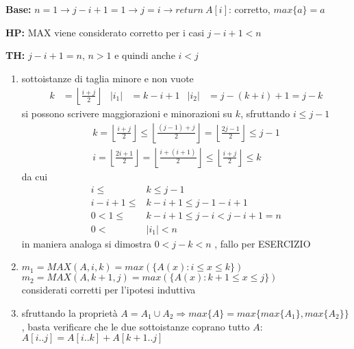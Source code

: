 \begin{description}
    \item{\textbf{Base:}} $n=1 \rightarrow j-i+1=1 \rightarrow j=i \rightarrow return \: A[i]$: corretto, $max\{a\}=a$
    \item{\textbf{HP:}} MAX viene considerato corretto per i casi $j-i+1 < n$
    \item{\textbf{TH:}} $j-i+1 = n$, $n>1$ e quindi anche $i<j$
        \begin{enumerate}[noitemsep,topsep=0pt,parsep=0pt,partopsep=0pt]
            \item sottoistanze di taglia minore e non vuote
                \begin{align*}
                    k&= \left\lfloor \frac{i+j}{2}\right\rfloor & |i_1| &= k-i+1  & |i_2| &= j-(k+i)+1 = j-k
                \end{align*}
                si possono scrivere maggiorazioni e minorazioni su $k$, sfruttando $i \leq j-1$
                \begin{gather*}
                    k= \left\lfloor \frac{i+j}{2}\right\rfloor \leq
                    \left\lfloor \frac{(j-1)+j}{2}\right\rfloor = 
                    \left\lfloor \frac{2j-1}{2}\right\rfloor \leq j-1 \\
                    i= \left\lfloor \frac{2i+1}{2}\right\rfloor
                    = \left\lfloor \frac{i+(i+1)}{2}\right\rfloor 
                    \leq \left\lfloor \frac{i+j}{2}\right\rfloor 
                    \leq k
                \end{gather*}
                da cui 
                \begin{equation*}
                    \begin{split}
                    i \leq &k \leq j-1 \\
                    i-i+1 \leq &k-i+1 \leq j-1-i+1 \\
                    0 < 1 \leq &k-i+1 \leq j-i < j-i+1 = n\\
                    0 < &|i_1| < n
                    \end{split}
                \end{equation*}
                in maniera analoga si dimostra $ 0 < j-k < n $ , fallo per ESERCIZIO
            \item 
                $m_1 = MAX(A,i,k) = max(\{A(x):i \leq x \leq k \}) $ \\
                $m_2 = MAX(A,k+1,j) = max(\{A(x):k+1 \leq x \leq j \}) $ \\
                considerati corretti per l'ipotesi induttiva
            \item sfruttando la proprietà $ A = A_1 \cup A_2 \Rightarrow max\{A\} = max\{max\{A_1\}, max\{A_2\}\}$,
                basta verificare che le due sottoistanze coprano tutto $A$: $A[i..j] = A[i..k] + A[k+1..j] $ 
        \end{enumerate}
\end{description}

